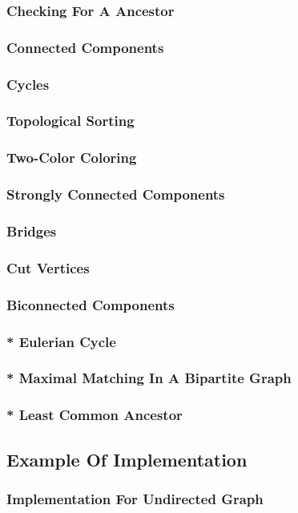 \documentclass[a4paper,12pt]{article}
\begin{document}
      \subsubsection{Checking For A Ancestor}

      \subsubsection{Connected Components}
      
      \subsubsection{Cycles}
      
      \subsubsection{Topological Sorting}

      \subsubsection{Two-Color Coloring}

      \subsubsection{Strongly Connected Components}

      \subsubsection{Bridges}

      \subsubsection{Cut Vertices}

      \subsubsection{Biconnected Components}

      \subsubsection{* Eulerian Cycle}

      \subsubsection{* Maximal Matching In A Bipartite Graph}

      \subsubsection{* Least Common Ancestor}

    \subsection{Example Of Implementation}

      \subsubsection{Implementation For Undirected Graph}

        
\end{document}
